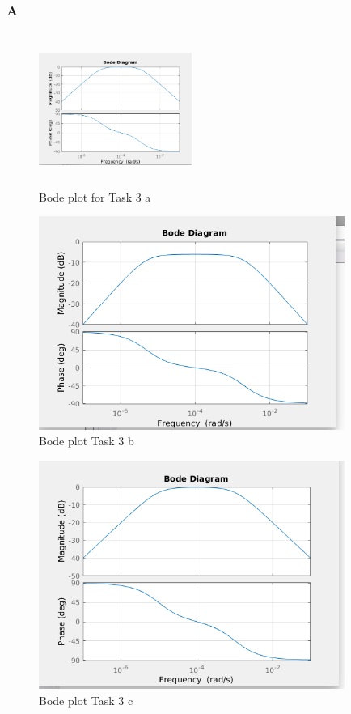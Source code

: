\documentclass{article}
\begin{document}
			\subsubsection{A}
			\begin{figure}[h!]
				\includegraphics[width=5cm,height=5cm]{Task3_A.png}
				\caption{Bode plot for Task 3 a}
			\end{figure}
			\begin{figure}[h!]
				\includegraphics[width=10cm]{Task3_B.png}
				\caption{Bode plot Task 3 b}
			\end{figure}
			\begin{figure}[h!]
				\includegraphics[width=10cm]{Task3_C.png}
				\caption{Bode plot Task 3 c}
			\end{figure}
		
\end{document}
